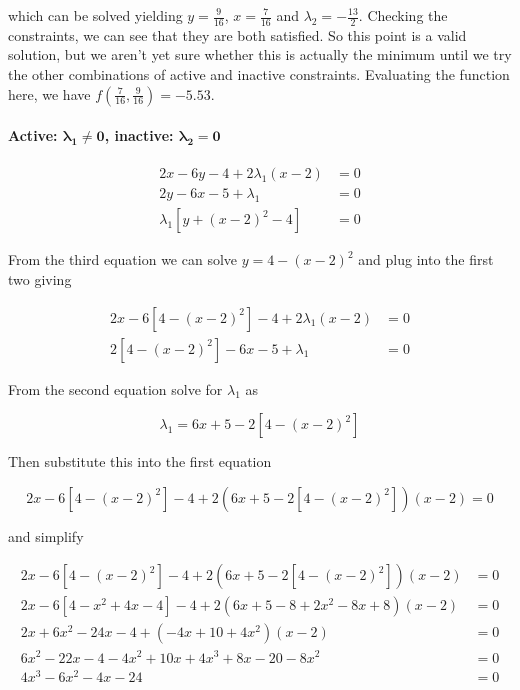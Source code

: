 \documentclass[11pt,letterpaper,onecolumn,notitlepage]{article}
\begin{document}
which can be solved yielding $y=\frac{9}{16}$, $x=\frac{7}{16}$ and $\lambda_{2}=-\frac{13}{2}$.
Checking the constraints, we can see that they are both satisfied.
So this point is a valid solution, but we aren't yet sure whether this is actually the minimum until we try the other combinations of active and inactive constraints.
Evaluating the function here, we have $f\left(\frac{7}{16},\frac{9}{16}\right)=-5.53$.

\paragraph{Active: $\boldsymbol{\lambda_{1}\neq0}$, inactive: $\boldsymbol{\lambda_{2}=0}$}

\begin{align*}
2x-6y-4+2\lambda_{1}(x-2)&=0 \\
2y-6x-5+\lambda_{1}&=0 \\
\lambda_{1}\left[y+(x-2)^{2}-4\right]&=0
\end{align*}

From the third equation we can solve $y=4-(x-2)^{2}$ and plug into the first two giving

\begin{align*}
  2x-6\left[4-(x-2)^{2}\right]-4+2\lambda_{1}(x-2)&=0 \\
  2\left[4-(x-2)^{2}\right]-6x-5+\lambda_{1}&=0
\end{align*}

From the second equation solve for $\lambda_{1}$ as

\begin{equation*}
  \lambda_{1}=6x+5-2\left[4-(x-2)^{2}\right]
\end{equation*}

Then substitute this into the first equation

\begin{equation*}
  2x-6\left[4-(x-2)^{2}\right]-4+2\left(6x+5-2\left[4-(x-2)^{2}\right]\right)(x-2)=0
\end{equation*}

and simplify

\begin{align*}
  2x-6\left[4-(x-2)^{2}\right]-4+2\left(6x+5-2\left[4-(x-2)^{2}\right]\right)(x-2)&=0 \\
  2x-6\left[4-x^{2}+4x-4\right]-4+2\left(6x+5-8+2x^{2}-8x+8\right)(x-2)&=0 \\
  2x+6x^{2}-24x-4+(-4x+10+4x^{2})(x-2)&=0 \\
  6x^{2}-22x-4-4x^{2}+10x+4x^{3}+8x-20-8x^{2}&=0 \\
  4x^{3}-6x^{2}-4x-24&=0
\end{align*}
\end{document}
